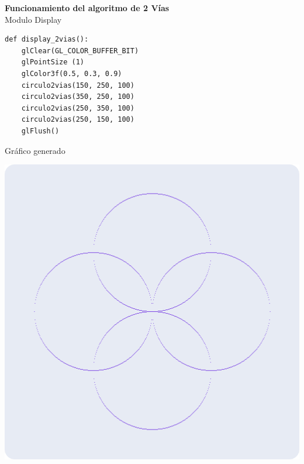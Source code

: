 \documentclass[a4paper]{article}
\begin{document}
\restoregeometry
\newpage
\Large{\textbf{Funcionamiento del algoritmo de 2 Vías}}\\[0.5cm]
Modulo Display 
\begin{center}
\begin{mycodebox}
\begin{lstlisting}
def display_2vias():
    glClear(GL_COLOR_BUFFER_BIT)
    glPointSize (1)
    glColor3f(0.5, 0.3, 0.9) 
    circulo2vias(150, 250, 100)
    circulo2vias(350, 250, 100)
    circulo2vias(250, 350, 100)
    circulo2vias(250, 150, 100)
    glFlush()
\end{lstlisting}
\end{mycodebox}
\end{center}
Gráfico generado
\begin{center}
\includegraphics[width=15cm]{src/2vias.png}
\end{center}
\newpage
\end{document}
